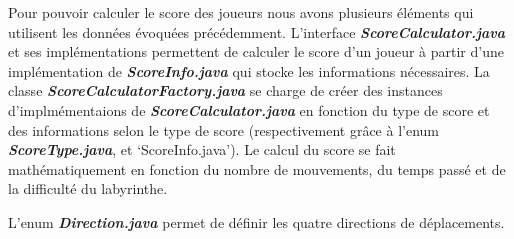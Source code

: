 Pour pouvoir calculer le score des joueurs nous avons plusieurs éléments qui
utilisent les données évoquées précédemment. L'interface \textbf{\textit{ScoreCalculator.java}}
et ses implémentations permettent de calculer le score d'un joueur à partir
d'une implémentation de \textbf{\textit{ScoreInfo.java}} qui stocke les informations
nécessaires. La classe \textbf{\textit{ScoreCalculatorFactory.java}} se charge de créer des
instances d'implmémentaions de \textbf{\textit{ScoreCalculator.java}} en fonction du type de
score et des informations selon le type de score (respectivement grâce à l'enum
\textbf{\textit{ScoreType.java}}, et `ScoreInfo.java'). Le calcul du score se fait
mathématiquement en fonction du nombre de mouvements, du temps passé et de la
difficulté du labyrinthe.

L'enum  \textbf{\textit{Direction.java}} permet de définir les quatre directions de déplacements.
